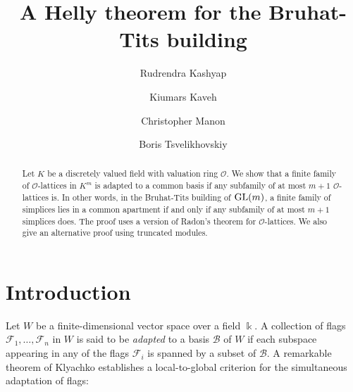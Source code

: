 \documentclass[12pt]{amsart}
\theoremstyle{definition}
\theoremstyle{remark}
\def \O{\mathcal{O}}
\def \GL{\textup{GL}}
\def \O{\mathcal{O}}
\begin{document}
\title{A Helly theorem for the Bruhat-Tits building}

	
\begin{abstract}
Let $K$ be a discretely valued field with valuation ring $\O$. We show that a finite family of $\mathcal{O}$-lattices in $K^m$ is adapted to a common basis if any subfamily of at most $m+1$ $\mathcal{O}$-lattices is. 
In other words, in the Bruhat-Tits building of $\GL(m)$, a finite family of simplices lies in a common apartment if and only if any subfamily of at most $m+1$ simplices does. The proof uses a version of Radon's theorem for $\mathcal{O}$-lattices. We also give an alternative proof using truncated modules.
\end{abstract}

\author{Rudrendra Kashyap}
\address{Department of Mathematics, University of Pittsburgh, Pittsburgh, PA, USA.}

\author{Kiumars Kaveh}
\address{Department of Mathematics, University of Pittsburgh, Pittsburgh, PA, USA.}

\author{Christopher Manon}
\address{Department of Mathematics, University of Kentucky, Lexington, KY, USA}

\author{Boris Tsvelikhovskiy} 
\address{Department of Mathematics, University of California, Riverside, CA, USA} 

\maketitle

\section{Introduction}

Let $W$ be a finite-dimensional vector space over a field $\Bbbk$. A collection of flags $\mathcal{F}_1,  \dots, \mathcal{F}_n$ in $W$ is said to be \textit{adapted} to a basis $\mathcal{B}$ of $W$ if each subspace appearing in any of the flags $\mathcal{F}_i$ is spanned by a subset of $\mathcal{B}$. A remarkable theorem of Klyachko \cite[Theorem~6.1.2]{Klyachko} establishes a local-to-global criterion for the simultaneous adaptation of flags:
\end{document}
